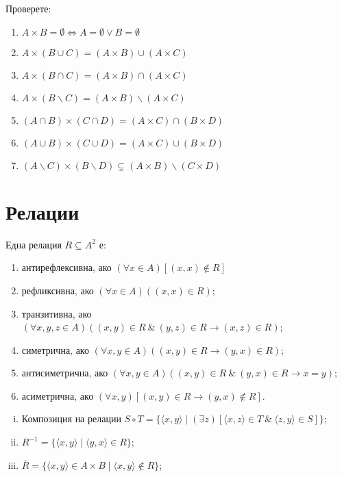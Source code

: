 \begin{problem}
  Проверете:
  \begin{enumerate}
  \item
    $A\times B = \emptyset \iff A = \emptyset \vee B = \emptyset$
  \item
    $A\times(B\cup C) = (A\times B)\cup(A\times C)$
  \item
    $A\times(B\cap C) = (A\times B)\cap(A\times C)$ 
  \item
    $A\times(B\backslash C) = (A\times B)\backslash(A\times C)$
  \item
    $(A\cap B)\times (C\cap D) = (A\times C)\cap(B\times D)$
  \item
    $(A\cup B)\times (C\cup D) = (A\times C)\cup(B\times D)$
  \item
    $(A\backslash C)\times(B\backslash D)\subsetneq (A\times B)\backslash(C\times D)$
  \end{enumerate}
\end{problem}




\section{Релации}


\begin{dfn}
  Една релация $R \subseteq A^2$ е:
  \begin{enumerate}[1)]
  \item
    антирефлексивна, ако
    $(\forall x\in A)[(x,x)\not\in R]$
  \item
    рефликсивна, ако
    $(\forall x\in A)((x,x)\in R)$;
  \item
    транзитивна, ако
    $(\forall x,y,z\in A)((x,y)\in R\ \&\ (y,z)\in R \rightarrow (x,z)\in R)$;
  \item
    симетрична, ако
    $(\forall x,y\in A)((x,y)\in R \rightarrow (y,x)\in R)$;
  \item
    антисиметрична, ако
    $(\forall x,y\in A)((x,y)\in R\ \&\ (y,x)\in R \rightarrow x = y)$;
  \item
    асиметрична, ако
    $(\forall x,y)[(x,y)\in R \rightarrow (y,x)\not\in R]$.
\end{enumerate}
\end{dfn}

\begin{enumerate}[(i)]
\item
  Композиция на релации
  $S\circ T = \{\langle{x,y}\rangle \mid (\exists z)[\langle{x,z}\rangle\in T\ \&\ \langle{z,y}\rangle \in S]\}$;
\item
  $R^{-1} = \{\langle{x,y}\rangle \mid \langle{y,x}\rangle \in R\}$;
\item
  $\overline{R} = \{\langle{x,y}\rangle \in A\times B \mid\langle{x,y}\rangle\not\in R\}$;
\end{enumerate}

